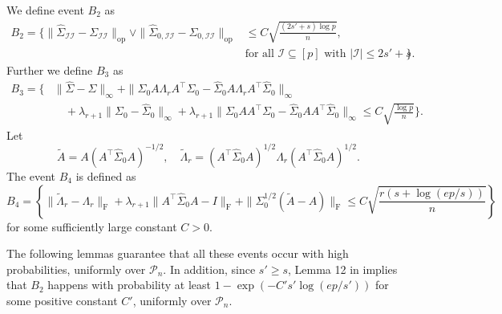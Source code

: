 \documentclass[11pt]{article}
\newcommand{\nb}[1]{\textcolor{orange}{\texttt{[#1]}}}
\newcommand{\gsc}[1]{\textcolor{blue}{\texttt{[#1]}}}
\newcommand{\red}{\color{red}}
\newcommand{\so}{\widehat{\Sigma}_0}
\newcommand{\cI}{{\mathcal{I}}}
\newcommand{\0}{{\mathbf{0}}}
\newcommand{\tA}{{\widetilde{A}}}
\newcommand{\tlambda}{{\widetilde{\Lambda}_r}}
\begin{document}
We define event $B_2$ as 
\begin{equation}
      \label{eq:event-B2} 
\begin{aligned}
B_2 = 
\bigg\{
\|\widehat{\Sigma}_{\cI\cI}-\Sigma_{\cI\cI}\|_{\mathrm{op}}\vee
\|\widehat{\Sigma}_{0,\cI\cI}-\Sigma_{0,\cI\cI}\|_{\mathrm{op}}
& \leq C\sqrt{\frac{(2s'+s)\log p}{n}},\\
& \text{for all $\cI\subseteq [p]$ with $|\cI|\leq 2s'+s$}
\bigg \}.   
\end{aligned}
\end{equation} 
Further we define $B_3$ as
\begin{equation}
\label{eq:event-B3}
\begin{aligned}
B_3=\bigg\{ 
& \|\widehat{\Sigma}-\Sigma\|_\infty+\|\Sigma_0A\Lambda_rA^\top\Sigma_0-\so A\Lambda_r A^\top\so\|_\infty \\
& \quad
+\lambda_{r+1}\|\Sigma_0-\widehat{\Sigma}_0\|_\infty+\lambda_{r+1}\|\Sigma_0AA^\top\Sigma_0-\widehat{\Sigma}_0AA^\top\so\|_\infty\leq C\sqrt{\frac{\log p}{n}}
 \bigg\}.
\end{aligned}
\end{equation}
Let 
\begin{equation}
      \label{eq:Atilde}
\tA=A(A^\top  \widehat{\Sigma}_0A)^{-1/2}, \quad
\tlambda=(A^\top  \widehat{\Sigma}_0A)^{1/2}\Lambda_r(A^\top  \widehat{\Sigma}_0A)^{1/2}.
\end{equation} 
The event $B_4$ is defined as
\begin{equation}
\label{eq:event-B4}
B_4 = \left\{  \|\tlambda-\Lambda_r\|_\mathrm{F}+\lambda_{r+1}\|A^\top\so A-I\|_\mathrm{F}+ \|\Sigma_0^{1/2}(\tA-A)\|_\mathrm{F}\leq C\sqrt{\frac{r(s+\log (ep/s))}{n}}\right\}
\end{equation}
for some sufficiently large constant $C>0$. 

The following lemmas guarantee that all these events occur with high probabilities, uniformly over $\mathcal{P}_n$.
In addition, since $s'\ge s$, Lemma 12 in \cite{gao2015minimax} implies
that
$B_2$ happens with probability at least $1-\exp(-C's'\log (ep/s'))$ for some positive constant $C'$, uniformly over $\mathcal{P}_n$.
\end{document}
